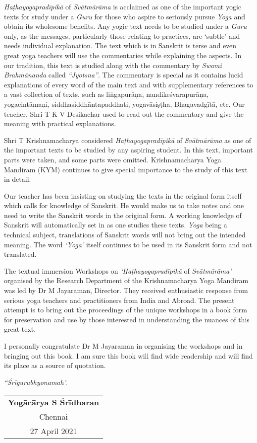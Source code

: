 \textit{Haṭhayogapradīpikā} of \textit{Svātmārāma} is acclaimed as one of the important yogic texts for study under a \textit{Guru} for those who aspire to seriously pursue \textit{Yoga} and obtain its wholesome benefits.  Any yogic text needs to be studied under a \textit{Guru} only, as the messages, particularly those relating to practices, are ‘subtle’ and needs individual explanation. The text which is in Sanskrit is terse and even great yoga teachers will use the commentaries while explaining the aspects. In our tradition, this text is studied along with the commentary by \textit{Swami Brahmānanda} called \textit{“Jyotsna”}. The commentary is special as it contains lucid explanations of every word of the main text and with supplementary references to a vast collection of texts, such as liṅgapurāṇa, nandikeśvarapurāṇa, yogacintāmaṇi, siddhasiddhāntapaddhati, yogavāsiṣṭha, Bhagavadgītā, etc. Our teacher, Shri T K V Desikachar used to read out the commentary and give the meaning with practical explanations.

Shri T Krishnamacharya considered \textit{Haṭhayogapradīpikā} of \textit{Svātmārāma} as one of the important texts to be studied by any aspiring student.  In this text, important parts were taken, and some parts were omitted. Krishnamacharya Yoga Mandiram (KYM) continues to give special importance to the study of this text in detail.

Our teacher has been insisting on studying the texts in the original form itself which calls for knowledge of Sanskrit.  He would make us to take notes and one need to write the Sanskrit words in the original form.  A working knowledge of Sanskrit will automatically set in as one studies these texts. \textit{Yoga} being a technical subject, translations of Sanskrit words will not bring out the intended meaning. The word \textit{‘Yoga’} itself continues to be used in its Sanskrit form and not translated.

The textual immersion Workshops on \textit{‘Haṭhayogapradīpikā} of \textit{Svātmā\-rāma’} organised by the Research Department of the Krishnamacharya Yoga Mandiram was led by Dr M Jayaraman, Director.  They received enthusiastic response from serious yoga teachers and practitioners from India and Abroad.  The present attempt is to bring out the proceedings of the unique workshops in a book form for preservation and use by those interested in understanding the nuances of this great text.

I personally congratulate Dr M Jayaraman in organising the workshops and in bringing out this book.  I am sure this book will find wide readership and will find its place as a source of quotation.
\bigskip

\centerline{\textit{“Śrīgurubhyonamah’.}}
\bigskip

\begin{flushright} 
\begin{tabular}{c}
\textbf{Yogācārya S Śrīdharan}\\
Chennai\\
27 April 2021
\end{tabular}
\end{flushright}
